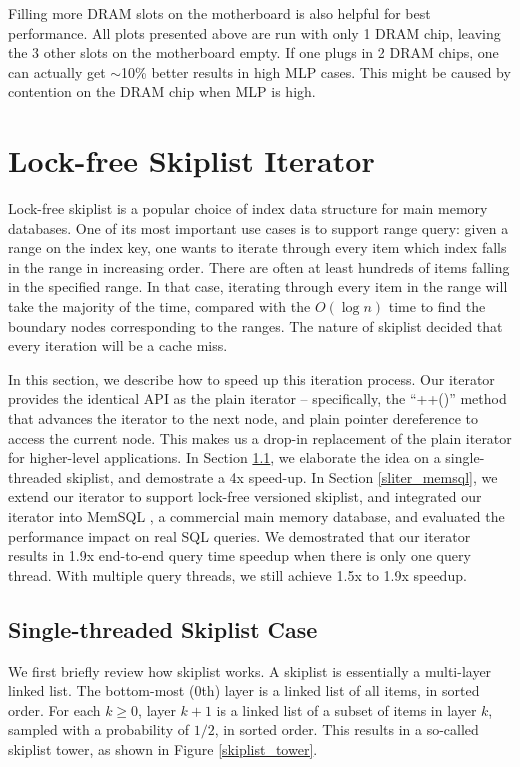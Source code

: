 \documentclass[11pt, usletter]{article}
\begin{document}
Filling more DRAM slots on the motherboard is also helpful for best performance. 
All plots presented above are run with only 1 DRAM chip, 
leaving the 3 other slots on the motherboard empty.
If one plugs in 2 DRAM chips, one can actually get $\sim$10\% better results in high MLP cases.
This might be caused by contention on the DRAM chip when MLP is high.

\section{Lock-free Skiplist Iterator} \label{sliter}

Lock-free skiplist is a popular choice of index data structure for main memory databases.
One of its most important use cases is to support range query: 
given a range on the index key, one wants to iterate through every item which index falls in the range in increasing order.
There are often at least hundreds of items falling in the specified range.
In that case, iterating through every item in the range will take the majority of the time, 
compared with the $O(\log n)$ time to find the boundary nodes corresponding to the ranges.
The nature of skiplist decided that every iteration will be a cache miss.

In this section, we describe how to speed up this iteration process. 
Our iterator provides the identical API as the plain iterator 
-- specifically, the ``++()'' method that advances the iterator to the next node,
and plain pointer dereference to access the current node.
This makes us a drop-in replacement of the plain iterator for higher-level applications.
In Section \ref{sliter_singlethread}, 
we elaborate the idea on a single-threaded skiplist, 
and demostrate a 4x speed-up. 
In Section \ref{sliter_memsql}, 
we extend our iterator to support lock-free versioned skiplist, 
and integrated our iterator into MemSQL \cite{memsql}, a commercial main memory database, 
and evaluated the performance impact on real SQL queries. 
We demostrated that our iterator results in 1.9x end-to-end query time speedup when there is only one query thread. 
With multiple query threads, we still achieve 1.5x to 1.9x speedup.

\subsection{Single-threaded Skiplist Case} \label{sliter_singlethread}

We first briefly review how skiplist works. 
A skiplist is essentially a multi-layer linked list. 
The bottom-most (0th) layer is a linked list of all items, in sorted order. 
For each $k\geq 0$, layer $k+1$ is a linked list of a subset of items in layer $k$, 
sampled with a probability of $1/2$, in sorted order. 
This results in a so-called skiplist tower, as shown in Figure \ref{skiplist_tower}.
 
\end{document}
